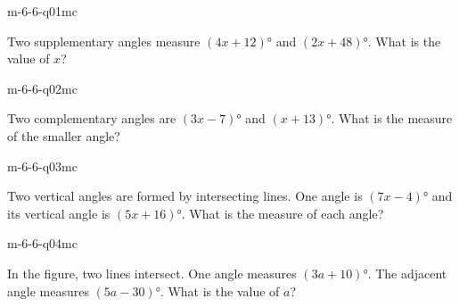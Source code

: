 

\begin{practiceQuestion}{m-6-6-q01}{mc}
\begin{questionText}
Two supplementary angles measure $(4x + 12)°$ and $(2x + 48)°$. What is the value of $x$?
\end{questionText}
\end{practiceQuestion}

\begin{practiceQuestion}{m-6-6-q02}{mc}
\begin{questionText}
Two complementary angles are $(3x - 7)°$ and $(x + 13)°$. What is the measure of the smaller angle?
\end{questionText}
\end{practiceQuestion}

\begin{practiceQuestion}{m-6-6-q03}{mc}
\begin{questionText}
Two vertical angles are formed by intersecting lines. One angle is $(7x - 4)°$ and its vertical angle is $(5x + 16)°$. What is the measure of each angle?
\end{questionText}
\end{practiceQuestion}

\begin{practiceQuestion}{m-6-6-q04}{mc}
\begin{questionText}
In the figure, two lines intersect. One angle measures $(3a + 10)°$. The adjacent angle measures $(5a - 30)°$. What is the value of $a$?
\end{questionText}
\end{practiceQuestion}

